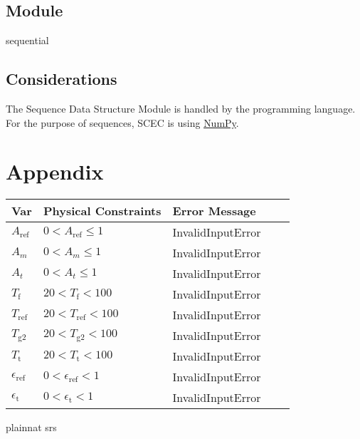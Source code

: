 \documentclass[12pt, titlepage]{article}
\begin{document}
\subsection{Module}

sequential


\subsection{Considerations}

The Sequence Data Structure Module is handled by the programming language. For the purpose of sequences, SCEC is using \href{https://numpy.org}{NumPy}.   

\newpage
\section{Appendix} \label{Appendix}

\begin{table}[!h]
  \caption{Possible errors for input} \label{verify_input}
  \renewcommand{\arraystretch}{1.2}
\noindent \begin{longtable*}{l l l l c} 
  \toprule
  \textbf{Var} & \textbf{Physical Constraints} & \textbf{Error Message} \\
  \midrule 

 $A_\text{ref}$ & $0 < A_\text{ref} \le 1$ & InvalidInputError \\
  $A_m$ & $0 < A_m \le 1 $ & InvalidInputError \\
  $A_t$ & $0 < A_t \le 1 $ & InvalidInputError \\
  $T_\text{f}$ & $20 < T_\text{f} < 100$ & InvalidInputError\\
  $T_\text{ref}$ & $20 < T_\text{ref} < 100$ &InvalidInputError \\
  $T_\text{g2}$ & $20 < T_\text{g2} < 100$ &InvalidInputError \\
  $T_\text{t}$ & $20 < T_\text{t} < 100$ & InvalidInputError\\
  $\epsilon_\text{ref}$ & $0 < \epsilon_\text{ref} < 1$ & InvalidInputError\\
   $\epsilon_\text{t}$ & $0 < \epsilon_\text{t} < 1$ & InvalidInputError \\
  
  \bottomrule
\end{longtable*}
\end{table}

\newpage
 {plainnat}
 {srs}
\end{document}
